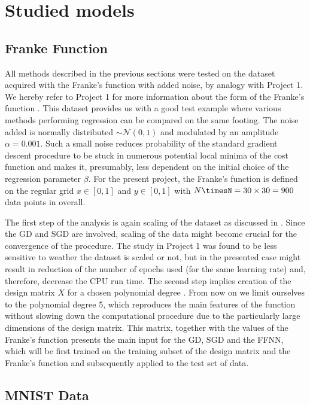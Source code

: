 \documentclass{emulateapj}
\begin{document}
\section{Studied models}
\label{sec: Studied models} 

\subsection{Franke Function}\label{subsec: franke function}

All methods described in the previous sections were tested on the dataset acquired with the Franke's function with added noise, by analogy with Project 1. We hereby refer to Project 1 for more information about the form of the Franke's function \cite{proj1, proj1_2}. This dataset provides us with a good test example where various methods performing regression can be compared on the same footing. The noise added is normally distributed $\sim\mathcal{N}(0,1)$ and modulated by an amplitude $\alpha=0.001$. Such a small noise reduces probability of the standard gradient descent procedure to be stuck in numerous potential  local minima of the cost function and makes it, presumably, less dependent on the initial choice of the regression parameter $\beta$.  For the present project, the Franke's function is defined on the regular grid $x\in[0,1]$ and $y\in[0,1]$ with $N\timesN=30\times 30=900$ data points in overall.

The first step of the analysis is again scaling of the dataset as discussed in \cite{proj1, proj1_2}. Since the GD and SGD are involved, scaling of the data might become crucial for the convergence of the procedure. The study in Project 1 was found to be less sensitive to weather the dataset is scaled or not, but in the presented case might result in reduction of the number of epochs used (for the same learning rate) and, therefore, decrease the CPU run time. The second step implies creation of the design matrix $X$ for a chosen polynomial degree \cite{proj1, proj1_2}. From now on we limit ourselves to the polynomial degree 5, which reproduces the main features of the function without slowing down the computational procedure due to the particularly large dimensions of the design matrix. This matrix, together with the values of the Franke's function presents the main input for the GD, SGD and the FFNN, which will be first trained on the training subset of the design matrix and the Franke's function and subsequently applied to the test set of data. 

\subsection{MNIST Data}\label{subsec: mnist data}
\end{document}
